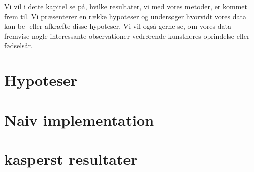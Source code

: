 {
{\sffamily Vi vil i dette kapitel se på, hvilke resultater, vi med vores
metoder, er kommet frem til. Vi præsenterer en række hypoteser og
undersøger hvorvidt vores data kan be- eller afkræfte disse hypoteser.
Vi vil også gerne se, om vores data fremvise nogle interessante
observationer vedrørende kunstneres oprindelse eller fødselsår.
}

\section{Hypoteser}


\section{Naiv implementation\label{section_naiv_koersel}}


\section{kasperst resultater}

}

